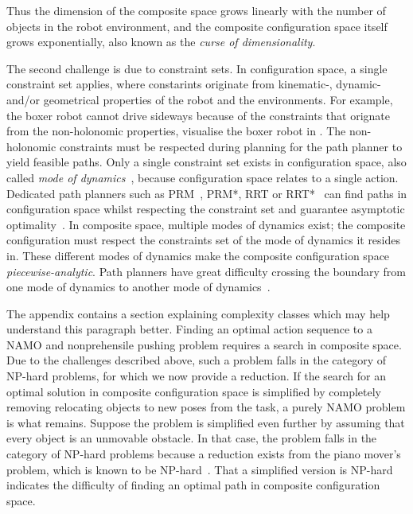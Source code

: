 Thus the dimension of the composite space grows linearly with the number of objects in the robot environment, and the composite configuration space itself grows exponentially, also known as the \textit{curse of dimensionality}.\bs

The second challenge is due to constraint sets. In configuration space, a single constraint set applies, where constarints originate from kinematic-, dynamic- and/or geometrical properties of the robot and the environments. For example, the boxer robot cannot drive sideways because of the constraints that orignate from the non-holonomic properties, visualise the boxer robot in . The non-holonomic constraints must be respected during planning for the path planner to yield feasible paths. Only a single constraint set exists in configuration space, also called \textit{mode of dynamics}~\cite{hauser_multimodal_2010}, because configuration space relates to a single action. Dedicated path planners such as \ac{PRM}~\cite{hsu_path_1997}, \ac{PRM*}, \ac{RRT} or \ac{RRT*}~\cite{karaman_samplingbased_2011} can find paths in configuration space whilst respecting the constraint set and guarantee asymptotic optimality~\cite{karaman_samplingbased_2011}. In composite space, multiple modes of dynamics exist; the composite configuration must respect the constraints set of the mode of dynamics it resides in. These different modes of dynamics make the composite configuration space \textit{piecewise-analytic}. Path planners have great difficulty crossing the boundary from one mode of dynamics to another mode of dynamics~\cite{vega-brown_asymptotically_2020}.\bs

The appendix contains a section explaining complexity classes which may help understand this paragraph better. Finding an optimal action sequence to a \ac{NAMO} and nonprehensile pushing problem requires a search in composite space. Due to the challenges described above, such a problem falls in the category of \ac{NP-hard} problems, for which we now provide a reduction. If the search for an optimal solution in composite configuration space is simplified by completely removing relocating objects to new poses from the task, a purely \ac{NAMO} problem is what remains. Suppose the problem is simplified even further by assuming that every object is an unmovable obstacle. In that case, the problem falls in the category of \ac{NP-hard} problems because a reduction exists from the piano mover's problem, which is known to be \ac{NP-hard}~\cite{reif_motion_1985}. That a simplified version is \ac{NP-hard} indicates the difficulty of finding an optimal path in composite configuration space.\bs

